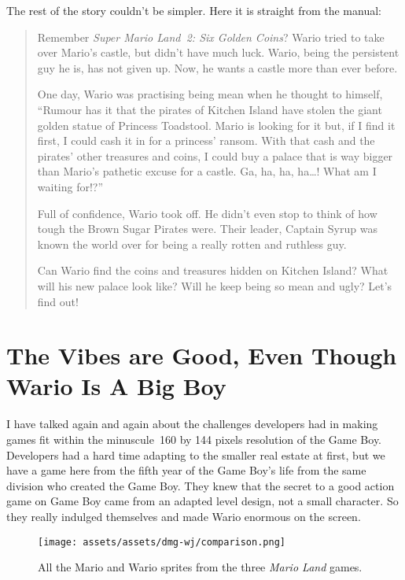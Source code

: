 \documentclass{book}
\begin{document}
The rest of the story couldn’t be simpler. Here it is straight from the manual:

\begin{quote}
Remember \emph{Super Mario Land~2: Six Golden Coins}? Wario tried to take over Mario’s castle, but didn’t have much luck. Wario, being the persistent guy he is, has not given up. Now, he wants a castle more than ever before.

One day, Wario was practising being mean when he thought to himself, “Rumour has it that the pirates of Kitchen Island have stolen the giant golden statue of Princess Toadstool. Mario is looking for it but, if I find it first, I could cash it in for a princess’ ransom. With that cash and the pirates’ other treasures and coins, I could buy a palace that is way bigger than Mario’s pathetic excuse for a castle. Ga, ha, ha, ha…! What am I waiting for!?”

Full of confidence, Wario took off. He didn’t even stop to think of how tough the Brown Sugar Pirates were. Their leader, Captain Syrup was known the world over for being a really rotten and ruthless guy.

Can Wario find the coins and treasures hidden on Kitchen Island? What will his new palace look like? Will he keep being so mean and ugly?
Let’s find out!
\end{quote} \par

\FloatBarrier\needspace{10mm}\section*{The Vibes are Good, Even Though Wario Is A Big Boy}\nopagebreak[4]

I have talked again and again about the challenges developers had in making games fit within the minuscule~160 by 144 pixels resolution of the Game Boy. Developers had a hard time adapting to the smaller real estate at first, but we have a game here from the fifth year of the Game Boy’s life from the same division who created the Game Boy. They knew that the secret to a good action game on Game Boy came from an adapted level design, not a small character. So they really indulged themselves and made Wario enormous on the screen.

\begin{figure}[hbt]
\vskip 10pt
\centering \texttt{[image: assets/assets/dmg-wj/comparison.png]}\par\pagetwodescription All the Mario and Wario sprites from the three \emph{Mario Land} games.
\vskip 6pt
\end{figure}
\end{document}
